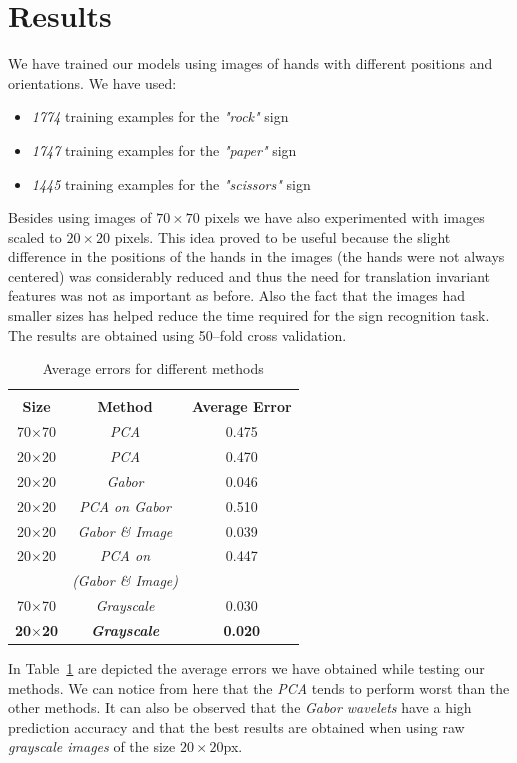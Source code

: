 \documentclass[a4paper, 11pt, twocolumn]{article}
\begin{document}
    \section{Results}
	\label{sec:results}
		We have trained our models using images of hands with different positions and orientations. We have used:
		\begin{itemize}
		\item \emph{1774} training examples for the \emph{"rock"} sign 
		\item \emph{1747} training examples for the \emph{"paper"} sign
		\item \emph{1445} training examples for the \emph{"scissors"} sign
		\end{itemize}
		Besides using images of $70\times 70$ pixels we have also experimented with images scaled to $20 \times 20$ pixels. This idea proved to be useful because the slight difference in the positions of the hands in the images (the hands were not always centered) was considerably reduced and thus the need for translation invariant features was not as important as before. Also the fact that the images had smaller sizes has helped reduce the time required for the sign recognition task.\\     
		\hspace*{10px}The results are obtained using 50--fold cross validation.\\
		\begin{table}[!hbtp]
		\begin{tabular}{| c | c | c |}
			\hline\hline
			& & \\
			\textbf{Size} & \textbf{Method} & \textbf{Average Error}\\[5px] 
			\hline\hline
			  70$\times$70 & \emph{PCA} & 0.475\\
			\hline
			  20$\times$20 & \emph{PCA} & 0.470\\
			\hline
			  20$\times$20 & \emph{Gabor} & 0.046\\
			\hline
			  20$\times$20 & \emph{PCA on Gabor} & 0.510\\
			\hline
			  20$\times$20 & \emph{Gabor \& Image} & 0.039\\
		 	\hline
			  20$\times$20 & \emph{PCA on} & 0.447\\
		               & \emph {(Gabor \& Image)}  &     \\ 			
			\hline
			  70$\times$70 & \emph{Grayscale} & 0.030\\
			\hline
			  \textbf{20$\times$20} & \textbf{\emph{Grayscale}} & \textbf{0.020}\\
			\hline
		\end{tabular}
		\caption{Average errors for different methods}
		\label{tab:res}
		\end{table}
		\hspace*{10px}In Table~\ref{tab:res} are depicted the average errors we have obtained while testing our methods. We can notice from here that the \emph{PCA} tends to perform worst than the other methods. It can also be observed that the \emph{Gabor wavelets} have a high prediction accuracy and that the best results are obtained when using raw \emph{grayscale images} of the size \emph{$20\times20$}px.  
\end{document}
